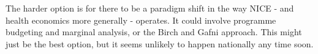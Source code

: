 The harder option is for there to be a paradigm shift in the way NICE - and health economics more generally - operates. It could involve programme budgeting and marginal analysis, or the Birch and Gafni approach\cite{Ruta_2005,Birch_1992,Gafni_2006}. This might just be the best option, but it seems unlikely to happen nationally any time soon.